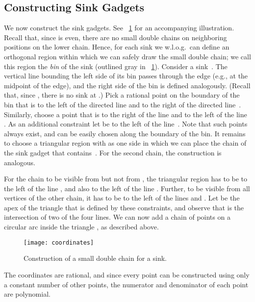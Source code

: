 \documentclass[a4paper,11pt]{article}
\begin{document}
\subsection{Constructing Sink Gadgets}
We now construct the sink gadgets.
See \figurename~\ref{fig_coordinates} for an accompanying illustration.
Recall that, since  is even, there are no small double chains on neighboring positions on the lower chain.
Hence, for each sink we w.l.o.g.\ can define an orthogonal region within which we can safely draw the small double chain; we call this region the \emph{bin} of the sink (outlined gray in \figurename~\ref{fig_coordinates}).
Consider a sink~.
The vertical line bounding the left side of its bin passes through the edge  (e.g., at the midpoint of the edge), and the right side of the bin is defined analogously.
(Recall that, since , there is no sink at .)
Pick a rational point  on the boundary of the bin that is to the left of the directed line  and to the right of the directed line~.
Similarly, choose a point  that is to the right of the line  and to the left of the line .
As an additional constraint let  be to the left of the line~.
Note that such points always exist, and can be easily chosen along the boundary of the bin.
It remains to choose a triangular region with  as one side in which we can place the chain of the sink gadget that contains~.
For the second chain, the construction is analogous.

For the chain to be visible from  but not from , the triangular region has to be to the left of the line , and also to the left of the line .
Further, to be visible from all vertices of the other chain, it has to be to the left of the lines  and .
Let  be the apex of the triangle that is defined by these constraints, and observe that  is the intersection of two of the four lines.
We can now add a chain of points on a circular arc inside the triangle , as described above.

\begin{figure}
\centering
\texttt{[image: coordinates]}
\caption{Construction of a small double chain for a sink.}
\label{fig_coordinates}
\end{figure}

The coordinates are rational, and since every point can be constructed using only a constant number of other points, the numerator and denominator of each point are polynomial.
\end{document}
